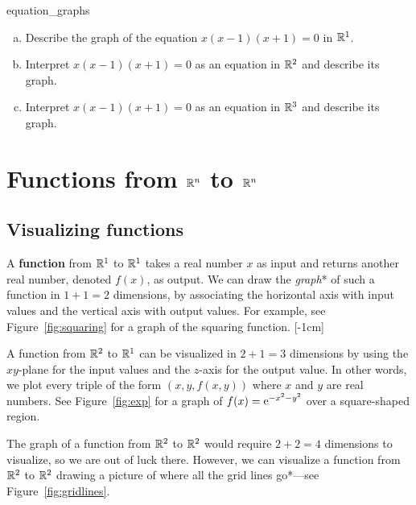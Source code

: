 \documentclass{watsonbook}
\begin{document}
\begin{exercise}{}{equation_graphs}
  \begin{enumerate}[(a), leftmargin = 12pt, itemsep = 4pt]
  \item Describe the graph of the equation $x(x-1)(x+1) = 0$ in
  $\mathbb{R}^1$. 
  \item Interpret $x(x-1)(x+1) = 0$ as an equation in $\mathbb{R}^2$ and
  describe its graph. 
  \item Interpret $x(x-1)(x+1) = 0$ as an equation in $\mathbb{R}^3$ and
    describe its graph.
  \end{enumerate}
\end{exercise}

\section{Functions from $\mathbb{R}^n$ to $\mathbb{R}^n$} \label{sec:RntoRn}

\subsection{Visualizing functions}

A \textbf{function} from $\mathbb{R}^1$ to $\mathbb{R}^1$ takes a real number $x$ as
input and returns another real number, denoted $f(x)$, as output. We
can draw the \textit{graph}* of such a function in $1 + 1 = 2$
dimensions, by associating the horizontal axis with input values and
the vertical axis with output values. For example, see
Figure~\ref{fig:squaring} for a graph of the squaring
function. [-1cm]

A function from $\mathbb{R}^2$ to $\mathbb{R}^1$ can be visualized in $2 + 1 = 3$
dimensions by using the $xy$-plane for the input values and the
$z$-axis for the output value. In other words, we plot every triple of
the form $(x,y,f(x,y))$ where $x$ and $y$ are real numbers. See
Figure~\ref{fig:exp} for a graph of $f(x) = \operatorname{e}^{-x^2 - y^2}$ over a
square-shaped region.

The graph of a function from $\mathbb{R}^2$ to $\mathbb{R}^2$ would require $2 + 2 = 4$
dimensions to visualize, so we are out of luck there. However, we can
visualize a function from $\mathbb{R}^2$ to $\mathbb{R}^2$ drawing a picture of where
all the grid lines go*---see
Figure~\ref{fig:gridlines}.
\end{document}

